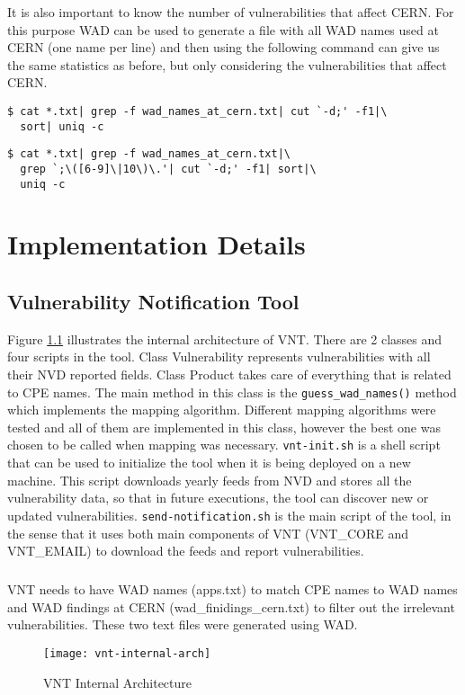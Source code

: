 It is also important to know the number of vulnerabilities that affect CERN. For this purpose WAD can be used to generate a file with all WAD names used at CERN (one name per line) and then using the following command can give us the same statistics as before, but only considering the vulnerabilities that affect CERN.
\begin{framed}
\begin{verbatim}
$ cat *.txt| grep -f wad_names_at_cern.txt| cut `-d;' -f1|\
  sort| uniq -c
\end{verbatim}
\end{framed}
\begin{framed}
\begin{verbatim}
$ cat *.txt| grep -f wad_names_at_cern.txt|\
  grep `;\([6-9]\|10\)\.'| cut `-d;' -f1| sort|\
  uniq -c
\end{verbatim}
\end{framed}
%
%
\chapter{Implementation Details}
\label{implementation-details}
\section{Vulnerability Notification Tool}

Figure \ref{figure:vnt-internal-arch} illustrates the internal architecture of VNT. 
There are 2 classes and four scripts in the tool. Class Vulnerability represents vulnerabilities with all their NVD reported fields. 
Class Product takes care of everything that is related to CPE names. The main method in this class is the \texttt{guess\_wad\_names()} method which implements the mapping algorithm. 
Different mapping algorithms were tested and all of them are implemented in this class, however the best one was chosen to be called when mapping was necessary. \texttt{vnt-init.sh} is a shell script that can be used to initialize the tool when it is being deployed on a new machine. This script downloads yearly feeds from NVD and stores all the vulnerability data, so that in future executions, the tool can discover new or updated vulnerabilities. \texttt{send-notification.sh} is the main script of the tool, in the sense that it uses both main components of VNT (VNT\_CORE and VNT\_EMAIL) to download the feeds and report vulnerabilities.
\paragraph{}
VNT needs to have WAD names (apps.txt) to match CPE names to WAD names and WAD findings at CERN (wad\_finidings\_cern.txt) to filter out the irrelevant vulnerabilities. These two text files were generated using WAD. 
\begin{figure}[H]
  \centering
    \texttt{[image: vnt-internal-arch]}
  \caption{VNT Internal Architecture}
   \label{figure:vnt-internal-arch}
\end{figure}

